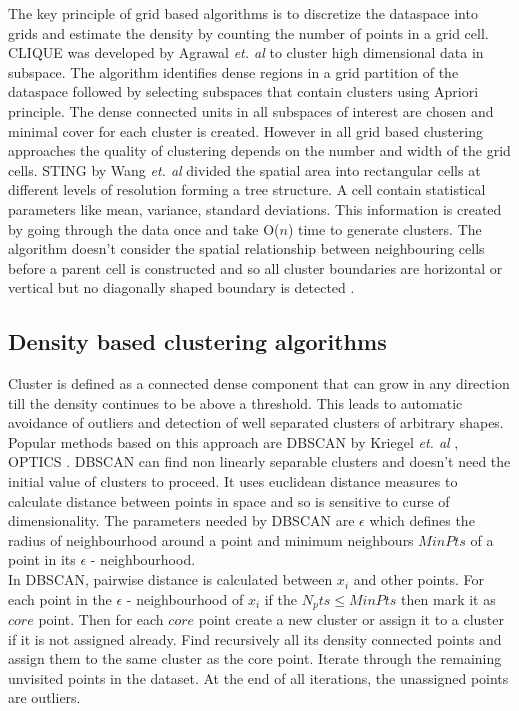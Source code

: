 The key principle of grid based algorithms is to discretize the dataspace into grids and estimate the density by counting the number of points in a grid cell. CLIQUE \cite{aps:3} \cite{aps:46} was developed by Agrawal \textit{et. al} to cluster high dimensional data in subspace. The algorithm identifies dense regions in a grid partition of the dataspace followed by selecting subspaces that contain clusters using Apriori principle. The dense connected units in all subspaces of interest are chosen and minimal cover for each cluster is created. However in all grid based clustering approaches the quality of clustering depends on the number and width of the grid cells. STING by Wang \textit{et. al} \cite{aps:46} divided the spatial area into rectangular cells at different levels of resolution forming a tree structure. A cell contain statistical parameters like mean, variance, standard deviations. This information is created by going through the data once and take O($n$) time to generate clusters. The algorithm doesn't consider the spatial relationship between neighbouring cells before a parent cell is constructed and so all cluster boundaries are horizontal or vertical but no diagonally shaped boundary is detected \cite{aps:46}.


\subsection{Density based clustering algorithms}

Cluster is defined as a connected dense component that can grow in any direction till the density continues to be above a threshold. This leads to automatic avoidance of outliers and detection of well separated clusters of arbitrary shapes. Popular methods based on this approach are DBSCAN by Kriegel \textit{et. al} \cite{aps:46}, OPTICS \cite{aps:46}. DBSCAN can find non linearly separable clusters and doesn't need the initial value of clusters to proceed. It uses euclidean distance measures to calculate distance between points in space and so is sensitive to curse of dimensionality. The parameters needed by DBSCAN are $\epsilon$ which defines the radius of neighbourhood around a point and minimum neighbours $MinPts$ of a point in its $\epsilon$ - neighbourhood. \\

In DBSCAN, pairwise distance is calculated between $x_i$ and other points. For each point in the $\epsilon$ - neighbourhood of $x_i$ if the $N_pts \leq MinPts$ then mark it as $core$ point. Then for each $core$ point create a new cluster or assign it to a cluster if it is not assigned already. Find recursively all its density connected points and assign them to the same cluster as the core point. Iterate through the remaining unvisited points in the dataset. At the end of all iterations, the unassigned points are outliers. \\

